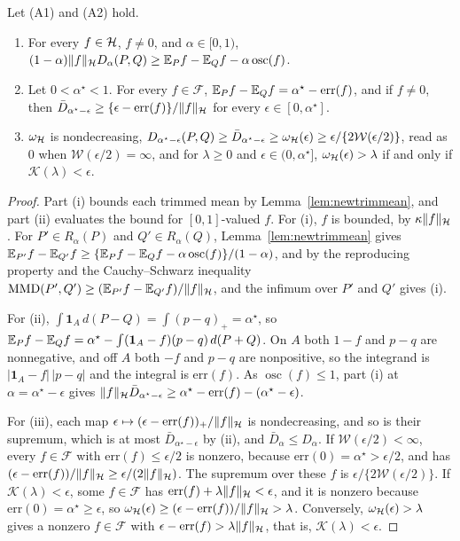 \begin{proposition}
\label{prop:newapproxgen}
Let (A1) and (A2) hold.
\begin{enumerate}[label=(\roman*),leftmargin=*]
\item For every $f\in\mathcal{H}$, $f\neq0$, and $\alpha\in[0,1)$,
$(1-\alpha)\|f\|_{\mathcal{H}} D_\alpha(P,Q)\ge\mathbb{E}_Pf-\mathbb{E}_Qf-\alpha\operatorname{osc}(f)$.
\item Let $0<\alpha^\star<1$. For every $f\in\mathcal F$, $\mathbb{E}_Pf-\mathbb{E}_Qf=\alpha^\star-\mathrm{err}(f)$, and if $f\neq0$, then
$\bar D_{\alpha^\star-\epsilon}\ge\{\epsilon-\mathrm{err}(f)\}/\|f\|_{\mathcal{H}}$ for every $\epsilon\in[0,\alpha^\star]$.
\item $\omega_{\mathcal{H}}$ is nondecreasing, $D_{\alpha^\star-\epsilon}(P,Q)\ge \bar D_{\alpha^\star-\epsilon}\ge\omega_{\mathcal{H}}(\epsilon)\ge
\epsilon/\{2\mathcal W(\epsilon/2)\}$, read as $0$ when $\mathcal W(\epsilon/2)=\infty$, and for $\lambda\ge0$ and
$\epsilon\in(0,\alpha^\star]$, $\omega_{\mathcal{H}}(\epsilon)>\lambda$ if and only if $\mathcal K(\lambda)<\epsilon$.
\end{enumerate}
\end{proposition}

\begin{proof}
Part (i) bounds each trimmed mean by Lemma~\ref{lem:newtrimmean}, and part (ii) evaluates the bound for
$[0,1]$-valued $f$. For (i), $f$ is bounded, by $\kappa\|f\|_{\mathcal{H}}$. For $P'\in R_\alpha(P)$ and $Q'\in R_\alpha(Q)$,
Lemma~\ref{lem:newtrimmean} gives $\mathbb{E}_{P'}f-\mathbb{E}_{Q'}f\ge\{\mathbb{E}_Pf-\mathbb{E}_Qf-\alpha\operatorname{osc}(f)\}/(1-\alpha)$, and by the
reproducing property and the Cauchy--Schwarz inequality $\operatorname{MMD}(P',Q')\ge(\mathbb{E}_{P'}f-\mathbb{E}_{Q'}f)/\|f\|_{\mathcal{H}}$, and the infimum over
$P'$ and $Q'$ gives (i).

For (ii), $\int\mathbf 1_A\,d(P-Q)=\int(p-q)_+=\alpha^\star$, so $\mathbb{E}_Pf-\mathbb{E}_Qf=\alpha^\star-\int(\mathbf 1_A-f)(p-q)\,d(P+Q)$. On $A$
both $1-f$ and $p-q$ are nonnegative, and off $A$ both $-f$ and $p-q$ are nonpositive, so the integrand is
$|\mathbf 1_A-f|\,|p-q|$ and the integral is $\mathrm{err}(f)$. As $\operatorname{osc}(f)\le1$, part (i) at
$\alpha=\alpha^\star-\epsilon$ gives $\|f\|_{\mathcal{H}} \bar D_{\alpha^\star-\epsilon}\ge\alpha^\star-\mathrm{err}(f)-(\alpha^\star-\epsilon)$.

For (iii), each map $\epsilon\mapsto(\epsilon-\mathrm{err}(f))_+/\|f\|_{\mathcal{H}}$ is nondecreasing, and so is their supremum,
which is at most $\bar D_{\alpha^\star-\epsilon}$ by (ii), and $\bar D_{\alpha}\le D_\alpha$. If $\mathcal W(\epsilon/2)<\infty$, every
$f\in\mathcal F$ with $\mathrm{err}(f)\le\epsilon/2$ is nonzero, because $\mathrm{err}(0)=\alpha^\star>\epsilon/2$, and has
$(\epsilon-\mathrm{err}(f))/\|f\|_{\mathcal{H}}\ge\epsilon/(2\|f\|_{\mathcal{H}})$. The supremum over these $f$ is
$\epsilon/\{2\mathcal W(\epsilon/2)\}$. If $\mathcal K(\lambda)<\epsilon$, some $f\in\mathcal F$ has
$\mathrm{err}(f)+\lambda\|f\|_{\mathcal{H}}<\epsilon$, and it is nonzero because $\mathrm{err}(0)=\alpha^\star\ge\epsilon$, so
$\omega_{\mathcal{H}}(\epsilon)\ge(\epsilon-\mathrm{err}(f))/\|f\|_{\mathcal{H}}>\lambda$. Conversely, $\omega_{\mathcal{H}}(\epsilon)>\lambda$ gives a
nonzero $f\in\mathcal F$ with $\epsilon-\mathrm{err}(f)>\lambda\|f\|_{\mathcal{H}}$, that is, $\mathcal K(\lambda)<\epsilon$.
\end{proof}

